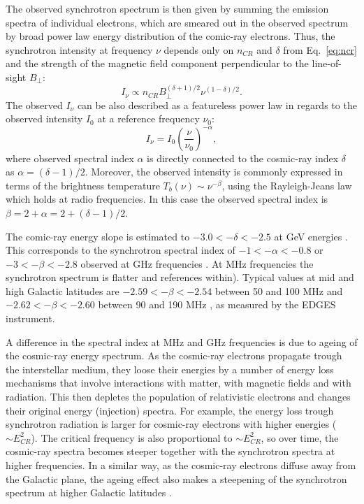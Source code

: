 The observed synchrotron spectrum is then given by summing the emission spectra of individual electrons, which are smeared out in the observed spectrum by broad power law energy distribution of the comic-ray electrons. Thus, the synchrotron intensity at frequency $\nu$ depends only on $n_{CR}$ and $\delta$ from Eq.~\ref{eq:ncr} and the strength of the magnetic field component perpendicular to the line-of-sight $B_\perp$:
\begin{equation}\label{eq:Isyn}
I_{\nu}\propto n_{CR}B_\perp^{(\delta+1)/2}\nu^{(1-\delta)/2}.
\end{equation}
The observed $I_{\nu}$ can be also described as a featureless power law in regards to the observed intensity $I_0$ at a reference frequency $\nu_0$:
\begin{equation}
I_{\nu}=I_0\left( \frac{\nu}{\nu_0} \right)^{-\alpha},
\end{equation}
where observed spectral index $\alpha$ is directly connected to the cosmic-ray  index $\delta$ as $\alpha=(\delta-1)/2$. Moreover,  the observed intensity is commonly expressed in terms of the brightness temperature $T_{b}(\nu)\sim\nu^{-\beta}$, using the Rayleigh-Jeans law which holds at radio frequencies. In this case the observed spectral index is $\beta=2+\alpha=2+(\delta-1)/2$. 

The comic-ray energy slope is estimated to  $-3.0<-\delta<-2.5$ at GeV energies \cite{lawson87, strong11, orlando13}. This corresponds to the synchrotron spectral index of $-1<-\alpha<-0.8$ or $-3<-\beta<-2.8$ observed at GHz frequencies \cite{reich88, platania98}.  At MHz frequencies the synchrotron spectrum is flatter \cite{rogers08, guzman11} and references within). Typical values at mid and high Galactic latitudes are $-2.59 < -\beta < -2.54$ between 50 and 100 MHz \cite{mozdzen19} and $-2.62 < -\beta < -2.60$  between 90 and 190 MHz \cite{mozdzen17}, as measured by the EDGES instrument.  

A difference in the spectral index at MHz and GHz frequencies is due to ageing of the cosmic-ray energy spectrum. As the cosmic-ray electrons propagate trough the interstellar medium, they loose their energies by a number of energy loss mechanisms \cite{longair11} that involve interactions with matter, with magnetic fields and with radiation. This then depletes the population of relativistic electrons and changes their original energy (injection) spectra. For example, the energy loss trough synchrotron radiation is larger for cosmic-ray electrons with higher energies ($\sim E_{CR}^2$). The critical frequency is also proportional to $\sim E_{CR}^2$, so over time, the cosmic-ray spectra becomes steeper together with the synchrotron spectra at higher frequencies.  In a similar way, as the cosmic-ray electrons diffuse away from the Galactic plane, the ageing effect also makes a steepening of the synchrotron spectrum at higher Galactic latitudes \cite{strong07}.

